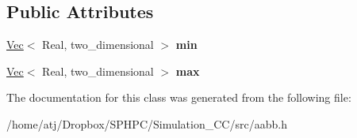 \subsection*{Public Attributes}
\begin{DoxyCompactItemize}
\item 
\hypertarget{classAABB_3_01Real_00_01two__dimensional_01_4_a270e28f2f508e7489c3e46905621c4df}{}\hyperlink{structVec}{Vec}$<$ Real, two\+\_\+dimensional $>$ {\bfseries min}\label{classAABB_3_01Real_00_01two__dimensional_01_4_a270e28f2f508e7489c3e46905621c4df}

\item 
\hypertarget{classAABB_3_01Real_00_01two__dimensional_01_4_ad5b370374a2357bd82b596e4d09fea2d}{}\hyperlink{structVec}{Vec}$<$ Real, two\+\_\+dimensional $>$ {\bfseries max}\label{classAABB_3_01Real_00_01two__dimensional_01_4_ad5b370374a2357bd82b596e4d09fea2d}

\end{DoxyCompactItemize}


The documentation for this class was generated from the following file\+:\begin{DoxyCompactItemize}
\item 
/home/atj/\+Dropbox/\+S\+P\+H\+P\+C/\+Simulation\+\_\+\+C\+C/src/aabb.\+h\end{DoxyCompactItemize}

